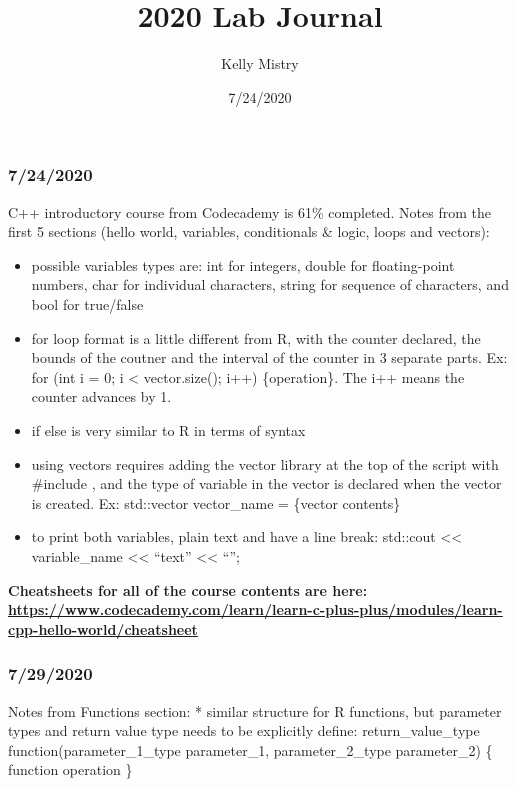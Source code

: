 \documentclass[]{article}
\title{2020 Lab Journal}
\author{Kelly Mistry}
\date{7/24/2020}
\providecommand{\tightlist}{%
  \setlength{\itemsep}{0pt}\setlength{\parskip}{0pt}}
\begin{document}
\maketitle

\hypertarget{section}{%
\subsubsection{7/24/2020}\label{section}}

C++ introductory course from Codecademy is 61\% completed. Notes from
the first 5 sections (hello world, variables, conditionals \& logic,
loops and vectors):

\begin{itemize}
\tightlist
\item
  possible variables types are: int for integers, double for
  floating-point numbers, char for individual characters, string for
  sequence of characters, and bool for true/false
\item
  for loop format is a little different from R, with the counter
  declared, the bounds of the coutner and the interval of the counter in
  3 separate parts. Ex: for (int i = 0; i \textless{} vector.size();
  i++) \{operation\}. The i++ means the counter advances by 1.
\item
  if else is very similar to R in terms of syntax
\item
  using vectors requires adding the vector library at the top of the
  script with \#include , and the type of variable in the vector is
  declared when the vector is created. Ex: std::vector vector\_name =
  \{vector contents\}
\item
  to print both variables, plain text and have a line break: std::cout
  \textless{}\textless{} variable\_name \textless{}\textless{} ``text''
  \textless{}\textless{} ``\n'';
\end{itemize}

\textbf{Cheatsheets for all of the course contents are here:
\url{https://www.codecademy.com/learn/learn-c-plus-plus/modules/learn-cpp-hello-world/cheatsheet}}

\hypertarget{section-1}{%
\subsubsection{7/29/2020}\label{section-1}}

Notes from Functions section: * similar structure for R functions, but
parameter types and return value type needs to be explicitly define:
return\_value\_type function(parameter\_1\_type parameter\_1,
parameter\_2\_type parameter\_2) \{ function operation \}
\end{document}
